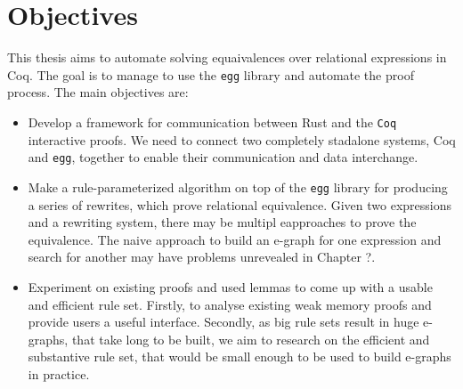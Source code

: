 \section{Objectives}
This thesis aims to automate solving equaivalences over relational expressions in Coq. The goal is to manage to use the \texttt{egg} library and automate the proof process. The main objectives are:
\begin{itemize}
    \item Develop a framework for communication between Rust and the \texttt{Coq} interactive proofs. We need to connect two completely stadalone systems, Coq and \texttt{egg}, together to enable their communication and data interchange.
    \item Make a rule-parameterized algorithm on top of the \texttt{egg} library for producing a series of rewrites, which prove relational equivalence. Given two expressions and a rewriting system, there may be multipl eapproaches to prove the equivalence. The naive approach to build an e-graph for one expression and search for another may have problems unrevealed in Chapter {?}. 
    \item Experiment on existing proofs and used lemmas to come up with a usable and efficient rule set. Firstly, to analyse existing weak memory proofs and provide users a useful interface. Secondly, as big rule sets result in huge e-graphs, that take long to be built, we aim to research on the efficient and substantive rule set, that would be small enough to be used to build e-graphs in practice.
\end{itemize}